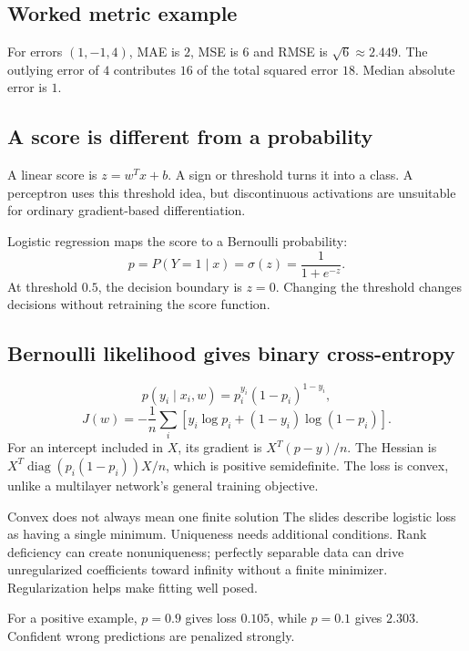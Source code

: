 \documentclass[11pt]{article}
\begin{document}
\subsection{Worked metric example}
For errors $(1,-1,4)$, MAE is $2$, MSE is $6$ and RMSE is $\sqrt6\approx2.449$. The outlying error of $4$ contributes $16$ of the total squared error $18$. Median absolute error is $1$.
\subsection{A score is different from a probability}
A linear score is $z=w^Tx+b$. A sign or threshold turns it into a class. A perceptron uses this threshold idea, but discontinuous activations are unsuitable for ordinary gradient-based differentiation.

Logistic regression maps the score to a Bernoulli probability:
\[
p=P(Y=1\mid x)=\sigma(z)=\frac1{1+e^{-z}}.
\]
At threshold $0.5$, the decision boundary is $z=0$. Changing the threshold changes decisions without retraining the score function.
\subsection{Bernoulli likelihood gives binary cross-entropy}
\[
p(y_i\mid x_i,w)=p_i^{y_i}(1-p_i)^{1-y_i},
\]
\[
J(w)=-\frac1n\sum_i[y_i\log p_i+(1-y_i)\log(1-p_i)].
\]
For an intercept included in $X$, its gradient is $X^T(p-y)/n$. The Hessian is $X^T\operatorname{diag}(p_i(1-p_i))X/n$, which is positive semidefinite. The loss is convex, unlike a multilayer network's general training objective.
\begin{careful}{Convex does not always mean one finite solution}
The slides describe logistic loss as having a single minimum. Uniqueness needs additional conditions. Rank deficiency can create nonuniqueness; perfectly separable data can drive unregularized coefficients toward infinity without a finite minimizer. Regularization helps make fitting well posed.
\end{careful}
For a positive example, $p=0.9$ gives loss $0.105$, while $p=0.1$ gives $2.303$. Confident wrong predictions are penalized strongly.
\end{document}
